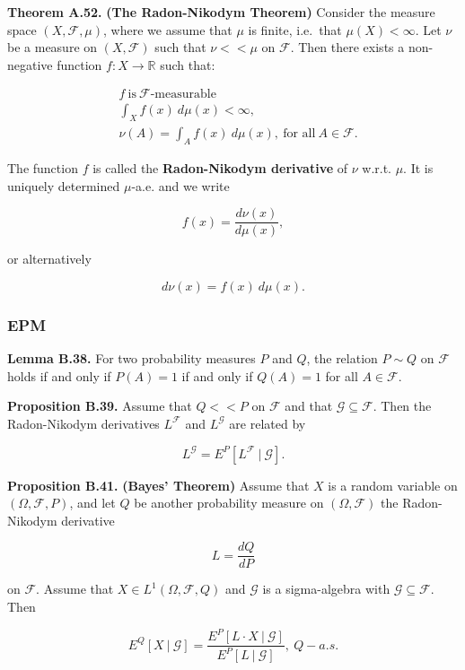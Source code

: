 \documentclass[
]{article}
\begin{document}
\textbf{Theorem A.52.} \textbf{(The Radon-Nikodym Theorem)} Consider the
measure space \((X,\mathcal{F},\mu)\), where we assume that \(\mu\) is
finite, i.e.~that \(\mu(X)<\infty\). Let \(\nu\) be a measure on
\((X,\mathcal{F})\) such that \(\nu <<\mu\) on \(\mathcal{F}\). Then
there exists a non-negative function \(f : X\to \mathbb{R}\) such that:

\begin{align*}
&f\ \text{is}\ \mathcal{F}\text{-measurable}\\
&\int_X f(x)\ d\mu(x)<\infty,\\
&\nu(A)=\int_Af(x)\ d\mu(x),\ \text{for all}\ A\in \mathcal{F}.
\end{align*}

The function \(f\) is called the \textbf{Radon-Nikodym derivative} of
\(\nu\) w.r.t. \(\mu\). It is uniquely determined \(\mu\)-a.e. and we
write

\[
f(x)=\frac{d\nu(x)}{d\mu(x)},
\]

or alternatively

\[
d\nu(x)=f(x)\ d\mu(x).
\]

\hypertarget{epm}{%
\subsubsection{EPM}\label{epm}}

\textbf{Lemma B.38.} For two probability measures \(P\) and \(Q\), the
relation \(P\sim Q\) on \(\mathcal{F}\) holds if and only if \(P(A)=1\)
if and only if \(Q(A)=1\) for all \(A\in\mathcal{F}\).

\textbf{Proposition B.39.} Assume that \(Q << P\) on \(\mathcal{F}\) and
that \(\mathcal{G}\subseteq \mathcal{F}\). Then the Radon-Nikodym
derivatives \(L^\mathcal{F}\) and \(L^\mathcal{G}\) are related by

\[
L^\mathcal{G}=E^P[L^\mathcal{F}\ \vert\ \mathcal{G}].
\]

\textbf{Proposition B.41.} \textbf{(Bayes' Theorem)} Assume that \(X\)
is a random variable on \((\Omega, \mathcal{F},P)\), and let \(Q\) be
another probability measure on \((\Omega,\mathcal{F})\) the
Radon-Nikodym derivative

\[
L=\frac{d Q}{dP}
\]

on \(\mathcal{F}\). Assume that \(X\in L^1(\Omega,\mathcal{F},Q)\) and
\(\mathcal{G}\) is a sigma-algebra with
\(\mathcal{G}\subseteq \mathcal{F}\). Then

\[
E^Q[X\ \vert\ \mathcal{G}]=\frac{E^P[L\cdot X\ \vert\ \mathcal{G}]}{E^P[L\ \vert\ \mathcal{G}]},\ Q-a.s.
\]
\end{document}
